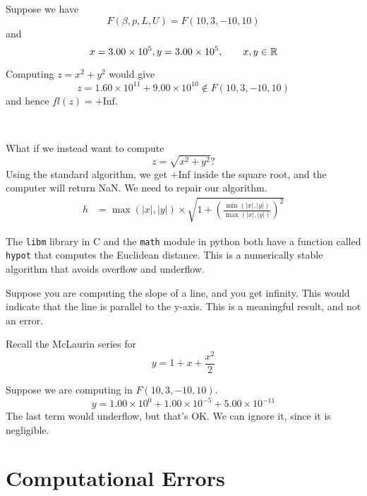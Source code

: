 \begin{example}
    Suppose we have \[
        F(\beta, p, L, U ) = F(10, 3, -10, 10)
    \] and \[
        x = 3.00 \times 10^5, y = 3.00 \times 10^5, \qquad x, y \in \mathbb{R}
    \]

    Computing \( z = x^2 + y^2 \) would give \[
        z = 1.60 \times 10^{11} + 9.00 \times 10^{10} \notin F(10, 3, -10, 10)
    \] and hence \( fl(z) = +\text{Inf} \).

        {~~~}

    What if we instead want to compute \[
        z = \sqrt{x^2 + y^2}?
    \]
    Using the standard algorithm, we get +Inf inside the square root, and the computer will return NaN. We need to repair our algorithm.
    \begin{align*}
        h & = \max(|x|, |y|) \times \sqrt{1 + \left(\frac{\min(|x|, |y|)}{\max(|x|, |y|)} \right)^2}
    \end{align*}
\end{example}

\begin{remark}
    The \texttt{libm} library in C and the \texttt{math} module in python both have a function called \texttt{hypot} that computes the Euclidean distance. This is a numerically stable algorithm that avoids overflow and underflow.
\end{remark}

\begin{note}
    Suppose you are computing the slope of a line, and you get infinity. This would indicate that the line is parallel to the y-axis. This is a meaningful result, and not an error.
\end{note}

\begin{note}


    Recall the McLaurin series for \[
        y = 1 + x + \frac{x^2}{2}
    \]

    Suppose we are computing in \( F(10, 3, -10, 10) \). \[
        y = 1.00 \times 10^0 + 1.00 \times 10^{-5} + 5.00 \times 10^{-11}
    \] The last term would underflow, but that's OK. We can ignore it, since it is negligible.
\end{note}

\section{Computational Errors}

